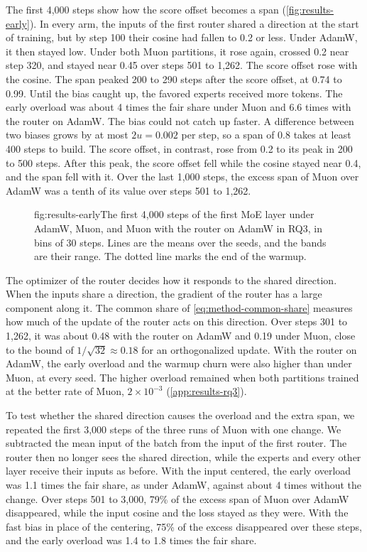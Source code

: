The first 4,000 steps show how the score offset becomes a span (\cref{fig:results-early}). In every arm, the inputs of the first router shared a direction at the start of training, but by step 100 their cosine had fallen to 0.2 or less. Under AdamW, it then stayed low. Under both Muon partitions, it rose again, crossed 0.2 near step 320, and stayed near 0.45 over steps 501 to 1,262. The score offset rose with the cosine. The span peaked 200 to 290 steps after the score offset, at 0.74 to 0.99. Until the bias caught up, the favored experts received more tokens. The early overload was about 4 times the fair share under Muon and 6.6 times with the router on AdamW\@. The bias could not catch up faster. A difference between two biases grows by at most $2u = 0.002$ per step, so a span of 0.8 takes at least 400 steps to build. The score offset, in contrast, rose from 0.2 to its peak in 200 to 500 steps. After this peak, the score offset fell while the cosine stayed near 0.4, and the span fell with it. Over the last 1,000 steps, the excess span of Muon over AdamW was a tenth of its value over steps 501 to 1,262.

\begin{figure}[The first 4,000 steps of the first MoE layer in RQ3]{fig:results-early}{The first 4,000 steps of the first MoE layer under AdamW, Muon, and Muon with the router on AdamW in RQ3, in bins of 30 steps. Lines are the means over the seeds, and the bands are their range. The dotted line marks the end of the warmup.}
  
\end{figure}

The optimizer of the router decides how it responds to the shared direction. When the inputs share a direction, the gradient of the router has a large component along it. The common share of \cref{eq:method-common-share} measures how much of the update of the router acts on this direction. Over steps 301 to 1,262, it was about 0.48 with the router on AdamW and 0.19 under Muon, close to the bound of $1 / \sqrt{32} \approx 0.18$ for an orthogonalized update. With the router on AdamW, the early overload and the warmup churn were also higher than under Muon, at every seed. The higher overload remained when both partitions trained at the better rate of Muon, $2 \times 10^{-3}$ (\cref{app:results-rq3}).

To test whether the shared direction causes the overload and the extra span, we repeated the first 3,000 steps of the three runs of Muon with one change. We subtracted the mean input of the batch from the input of the first router. The router then no longer sees the shared direction, while the experts and every other layer receive their inputs as before. With the input centered, the early overload was 1.1 times the fair share, as under AdamW, against about 4 times without the change. Over steps 501 to 3,000, 79\% of the excess span of Muon over AdamW disappeared, while the input cosine and the loss stayed as they were. With the fast bias in place of the centering, 75\% of the excess disappeared over these steps, and the early overload was 1.4 to 1.8 times the fair share.


